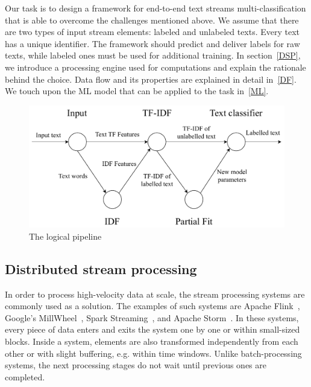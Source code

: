 

Our task is to design a framework for end-to-end text streams multi-classification that is able to overcome the challenges mentioned above. We assume that there are two types of input stream elements: labeled and unlabeled texts. Every text has a unique identifier. The framework should predict and deliver labels for raw texts, while labeled ones must be used for additional training. In section~\ref{DSP}, we introduce a processing engine used for computations and explain the rationale behind the choice. Data flow and its properties are explained in detail in~\ref{DF}. We touch upon the ML model that can be applied to the task in~\ref{ML}.

\begin{figure}[htbp]
  \centering
  \includegraphics[scale=0.48]{pics/logical-graph}
  \caption{The logical pipeline}
  \label {logical_graph}
\end{figure}

\subsection{Distributed stream processing\label{DSP}}

In order to process high-velocity data at scale, the stream processing systems are commonly used as a solution. The examples of such systems are Apache Flink~\cite{Carbone:2017:SMA:3137765.3137777}, Google's MillWheel~\cite{Akidau:2013:MFS:2536222.2536229}, Spark Streaming~\cite{Zaharia:2012:DSE:2342763.2342773}, and Apache Storm~\cite{apache:storm}. In these systems, every piece of data enters and exits the system one by one or within small-sized blocks. Inside a system, elements are also transformed independently from each other or with slight buffering, e.g. within time windows. Unlike batch-processing systems, the next processing stages do not wait until previous ones are completed. 

